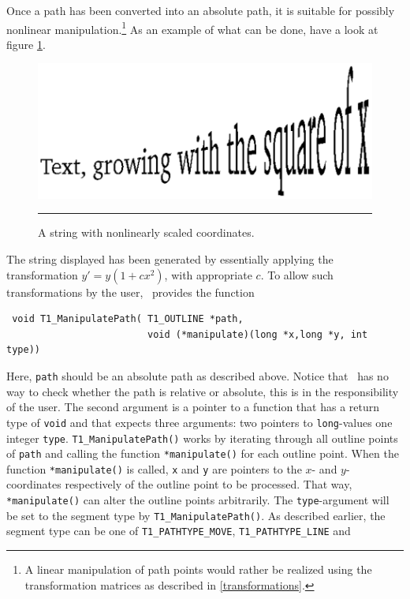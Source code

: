 Once a path has been converted into an absolute path, it is
suitable for possibly nonlinear manipulation.\footnote{A linear manipulation
  of path points would rather be realized using the transformation matrices as
  described in \ref{transformations}.}
As an example of what can be done, have a look at figure \ref{figure:manipulation}. 
\begin{figure}[t]
\hfill
\includegraphics[scale=1.0]{manipulate}
\hfill\break
\vskip3mm
\hrule\vskip3mm\small
\caption{\label{figure:manipulation}A string with nonlinearly scaled coordinates.} 
\end{figure}
The string displayed has been generated by essentially applying the
transformation $y'= y(1+cx^2)$, with appropriate $c$. To allow such
transformations by the user, \tonelib\ provides the function
\precorr
\begin{verbatim}
 void T1_ManipulatePath( T1_OUTLINE *path,
                         void (*manipulate)(long *x,long *y, int type))
\end{verbatim}\postcorr
Here, \verb+path+ should be an absolute path as described above. Notice that
\tonelib\ has no way to check whether the path is relative or absolute, this
is in the responsibility of the user. The second argument is a pointer to a
function that has a return type of \verb+void+ and that expects three
arguments: two pointers to \verb+long+-values one integer \verb+type+.
\verb+T1_ManipulatePath()+ works by iterating through all outline points of
\verb+path+ and calling the function \verb+*manipulate()+ for each outline
point. When the function \verb+*manipulate()+ is called, \verb+x+ and \verb+y+
are pointers to the $x$- and $y$-coordinates respectively of the outline point
to be processed. That way, \verb+*manipulate()+ can alter the outline
points arbitrarily. The \verb+type+-argument will be set to the segment type
by \verb+T1_ManipulatePath()+. As described earlier, the segment type can be
one of \verb+T1_PATHTYPE_MOVE+, \verb+T1_PATHTYPE_LINE+ and
